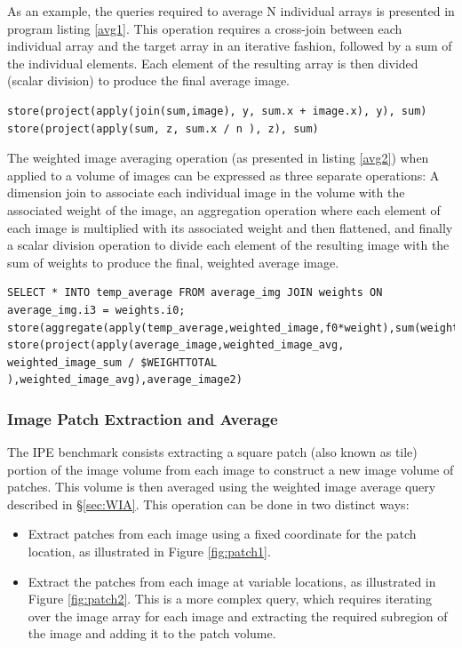 \documentclass[letterpaper,twocolumn,10pt]{article}
\begin{document}
As an example, the queries required to average N individual arrays is presented in  program listing \ref{avg1}. This operation requires a cross-join between each individual array and the target array in an iterative fashion, followed by a sum of the individual elements. Each element of the resulting array is then divided (scalar division) to produce the final average image.

\begin{lstlisting}[caption=Averaging N individual image arrays in SciDB, frame=single, label=avg1]
store(project(apply(join(sum,image), y, sum.x + image.x), y), sum)
store(project(apply(sum, z, sum.x / n ), z), sum)
\end{lstlisting}

The weighted image averaging operation (as presented in listing \ref{avg2}) when applied to a volume of images can be expressed as three separate operations: A dimension join to associate each individual image in the volume with the associated weight of the image, an aggregation operation where each element of each image is multiplied with its associated weight and then flattened, and finally a scalar division operation to divide each element of the resulting image with the sum of weights to produce the final, weighted average image.

\begin{lstlisting}[caption=Weighted Average of images in a single SciDB Volume, frame=single, label=avg2, float]
SELECT * INTO temp_average FROM average_img JOIN weights ON average_img.i3 = weights.i0;
store(aggregate(apply(temp_average,weighted_image,f0*weight),sum(weighted_image),i0,i1,i2),average_image);
store(project(apply(average_image,weighted_image_avg, weighted_image_sum / $WEIGHTTOTAL ),weighted_image_avg),average_image2)
\end{lstlisting}

\subsubsection{Image Patch Extraction and Average} \label{sec:IPE}
The IPE benchmark consists extracting a square patch (also known as tile) portion of the image volume from each image to construct a new image volume of patches. This volume is then averaged using the weighted image average query described in \S\ref{sec:WIA}. This operation can be done in two distinct ways:

\begin{itemize}
\item Extract patches from each image using a fixed coordinate for the patch location, as illustrated in Figure \ref{fig:patch1}. 

\item Extract the patches from each image at variable locations, as illustrated in Figure \ref{fig:patch2}. This is a more complex query, which requires iterating over the image array for each image and extracting the required subregion of the image and adding it to the patch volume.
\end{itemize}
\end{document}
